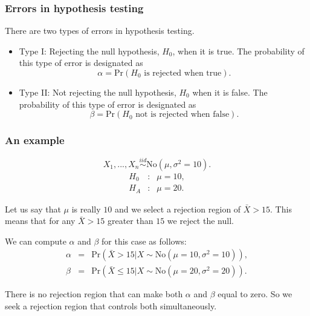 \begin{frame}[fragile]\frametitle{Errors in hypothesis testing}

There are two types of errors in hypothesis testing.
\begin{itemize}

\item Type I: Rejecting the null hypothesis, $H_0$, when it is
true. The probability of this type of error is designated as
$$\alpha = \mbox{Pr}(\mbox{$H_0$ is rejected when true}).$$


\item Type II: Not rejecting the null hypothesis, $H_0$ when it is
false. The probability of this type of error is designated as
$$\beta = \mbox{Pr}(\mbox{$H_0$ not is rejected when false}).$$


\end{itemize}

\end{frame}


\begin{frame}[fragile]\frametitle{An example}

{\tiny
$$X_1,...,X_n \stackrel{iid}{\sim} \mbox{No}(\mu,\sigma^2= 10).$$
\begin{eqnarray*}
H_0&:& \mu= 10, \\
H_A&:& \mu= 20.
\end{eqnarray*}

Let us say that $\mu$ is really $10$ and we select a rejection
region of $\bar{X} > 15$. This means that for any $\bar{X} > 15$
greater than $15$ we reject the null.  

We can compute $\alpha$ and $\beta$ for this case as follows:
\begin{eqnarray*}
\alpha &= &\mbox{Pr}(\bar{X} > 15 | X \sim \mbox{No}(\mu=10,\sigma^2=10)), \\
\beta &= &\mbox{Pr}(\bar{X} \leq 15 | X \sim \mbox{No}(\mu=20,\sigma^2=20)).
\end{eqnarray*}

There is no rejection region that can make both $\alpha$ and $\beta$
equal to zero. So we seek a rejection region that controls both
simultaneously.

}
\end{frame}

